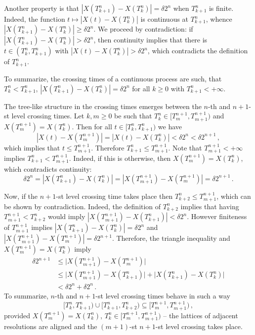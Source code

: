 \documentclass[a4paper]{article}
\begin{document}
Another property is that $|X(T_{k+1}^n) - X(T_k^n)| = \delta 2^n$ when $T_{k+1}^n$
is finite. Indeed, the function $t \mapsto |X(t) - X(T_k^n)|$ is continuous at $T_{k+1}^n$,
whence $|X(T_{k+1}^n) - X(T_k^n)| \geq \delta 2^n$. We proceed by contradiction:
if $|X(T_{k+1}^n) - X(T_k^n)| > \delta 2^n$, then continuity implies that there is
$t\in (T_k^n, T_{k+1}^n)$ with $|X(t) - X(T_k^n)| > \delta 2^n$, which contradicts
the definition of $T_{k+1}^n$.

To summarize, the crossing times of a continuous process are such, that $T_k^n < T_{k+1}^n$,
$|X(T_{k+1}^n) - X(T_k^n)| = \delta 2^n$ for all $k\geq0$ with $T_{k+1}^n < +\infty$.

The tree-like structure in the crossing times emerges between the $n$-th and $n+1$-st
level crossing times. Let $k, m\geq 0$ be such that $T_k^n \in [T_m^{n+1}, T_{m+1}^{n+1})$
and $X(T_m^{n+1}) = X(T_k^n)$. Then for all $t \in [T_k^n, T_{k+1}^n)$ we have
\begin{equation*}
    |X(t) - X(T_m^{n+1})| = |X(t) - X(T_k^n)| < \delta 2^n < \delta 2^{n+1} \,,
\end{equation*}
which implies that $t \leq T_{m+1}^{n+1}$. Therefore $T_{k+1}^n \leq T_{m+1}^{n+1}$.
Note that $T_{m+1}^{n+1} < +\infty$ implies $T_{k+1}^n < T_{m+1}^{n+1}$. Indeed,
if this is otherwise, then $X(T_m^{n+1}) = X(T_k^n)$, which contradicts continuity:
\begin{equation*}
    \delta 2^n = |X(T_{k+1}^n) - X(T_k^n)|
    = |X(T_{m+1}^{n+1}) - X(T_m^{n+1})| = \delta 2^{n+1}\,.
\end{equation*}

Now, if the $n+1$-st level crossing time takes place then $T_{k+2}^n \leq T_{m+1}^{n+1}$,
which can be shown by contradiction. Indeed, the definition of $T_{k+2}^n$ implies
that having $T_{m+1}^{n+1} < T_{k+2}^n$ would imply $|X(T_{m+1}^{n+1}) - X(T_{k+1}^n)| < \delta 2^n$.
However finiteness of $T_{m+1}^{n+1}$ implies $|X(T_{k+1}^n) - X(T_k^n)| = \delta 2^n$
and $|X(T_{m+1}^{n+1}) - X(T_m^{n+1})| = \delta 2^{n+1}$. Therefore, the triangle
inequality and $X(T_m^{n+1}) = X(T_k^n)$ imply
\begin{align*}
    \delta 2^{n+1}
    &\leq \bigl|X(T_{m+1}^{n+1}) - X(T_m^{n+1})\bigr| \\
    &\leq \bigl|X(T_{m+1}^{n+1}) - X(T_{k+1}^n)\bigr|
       + \bigl|X(T_{k+1}^n) - X(T_k^n)\bigr| \\
    &< \delta 2^n + \delta 2^n \,.
\end{align*}
To summarize, $n$-th and $n+1$-st level crossing times behave in such a way
\begin{equation} \label{eq:duration_partition}
    \bigl[T_k^n, T_{k+1}^n\bigr) \cup \bigl[T_{k+1}^n, T_{k+2}^n\bigr)
        \subseteq \bigl[T_m^{n+1}, T_{m+1}^{n+1}\bigr)
    \,,
\end{equation}
provided $X(T_m^{n+1}) = X(T_k^n)$, $T_k^n \in [T_m^{n+1}, T_{m+1}^{n+1})$ -- the
lattices of adjacent resolutions are aligned and the $(m+1)$-st $n+1$-st level crossing
takes place.
\end{document}

